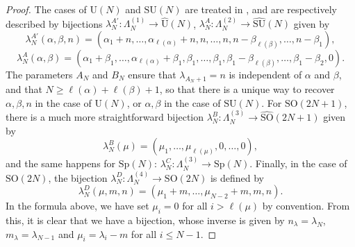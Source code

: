 \documentclass[11pt,a4paper,reqno]{article}
\theoremstyle{definition}
\theoremstyle{remark}
\newcommand\SU{{\mathrm{SU}}}
\newcommand\SO{{\mathrm{SO}}}
\newcommand\Sp{{\mathrm{Sp}}}
\newcommand\U{{\mathrm U}}
\begin{document}
\begin{proof}
The cases of $\U(N)$ and $\SU(N)$ are treated in \cite{Lem,LM2}, and are respectively described by bijections $\lambda_N^{A'}:\Lambda_N^{(1)}\to\widehat{\U}(N)$, $\lambda_N^A:\Lambda_N^{(2)}\to\widehat{\SU}(N)$ given by
\[
\lambda_N^{A'}(\alpha,\beta,n)= (\alpha_1+n,\ldots,\alpha_{\ell(\alpha)}+n,n,\ldots,n,n-\beta_{\ell(\beta)},\ldots,n-\beta_1),
\]
\[
\lambda_N^A(\alpha,\beta)=(\alpha_1+\beta_1,\ldots,\alpha_{\ell(\alpha)}+\beta_1,\beta_1,\ldots,\beta_1,\beta_1-\beta_{\ell(\beta)},\ldots,\beta_1-\beta_2,0).
\]
The parameters $A_N$ and $B_N$ ensure that $\lambda_{A_N+1}=n$ is independent of $\alpha$ and $\beta$, and that $N\geq \ell(\alpha)+\ell(\beta)+1$, so that there is a unique way to recover $\alpha,\beta,n$ in the case of $\U(N)$, or $\alpha,\beta$ in the case of $\SU(N)$. For $\SO(2N+1)$, there is a much more straightforward bijection $\lambda_N^B:\Lambda_N^{(3)}\to\widehat{\SO}(2N+1)$ given by
\[
\lambda_N^B(\mu)=(\mu_1,\ldots,\mu_{\ell(\mu)},0,\ldots,0),
\]
and the same happens for $\Sp(N)$: $\lambda_N^C:\Lambda_N^{(3)}\to\Sp(N)$. Finally, in the case of $\SO(2N)$, the bijection $\lambda_N^D:\Lambda_N^{(4)}\to\SO(2N)$ is defined by
\[
\lambda_N^D(\mu,m,n)=(\mu_1+m,\ldots,\mu_{N-2}+m,m,n).
\]
In the formula above, we have set $\mu_i=0$ for all $i>\ell(\mu)$ by convention. From this, it is clear that we have a bijection, whose inverse is given by $n_\lambda=\lambda_N$, $m_\lambda=\lambda_{N-1}$ and $\mu_i=\lambda_i-m$ for all $i\leq N-1$.
\end{proof}
\end{document}
